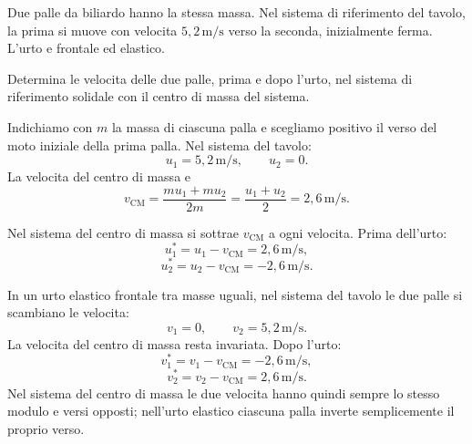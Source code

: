 
\begin{esercizio}
Due palle da biliardo hanno la stessa massa. Nel sistema di riferimento del
tavolo, la prima si muove con velocita \(5{,}2\,\mathrm{m/s}\) verso la
seconda, inizialmente ferma. L'urto e frontale ed elastico.

Determina le velocita delle due palle, prima e dopo l'urto, nel sistema di
riferimento solidale con il centro di massa del sistema.
\end{esercizio}

\begin{soluzione}
Indichiamo con \(m\) la massa di ciascuna palla e scegliamo positivo il verso
del moto iniziale della prima palla. Nel sistema del tavolo:
\[
u_1=5{,}2\,\mathrm{m/s},
\qquad
u_2=0.
\]
La velocita del centro di massa e
\[
v_{\mathrm{CM}}
=\frac{m u_1+m u_2}{2m}
=\frac{u_1+u_2}{2}
=2{,}6\,\mathrm{m/s}.
\]

Nel sistema del centro di massa si sottrae \(v_{\mathrm{CM}}\) a ogni
velocita. Prima dell'urto:
\[
u_1^*=u_1-v_{\mathrm{CM}}=2{,}6\,\mathrm{m/s},
\]
\[
u_2^*=u_2-v_{\mathrm{CM}}=-2{,}6\,\mathrm{m/s}.
\]

In un urto elastico frontale tra masse uguali, nel sistema del tavolo le due
palle si scambiano le velocita:
\[
v_1=0,
\qquad
v_2=5{,}2\,\mathrm{m/s}.
\]
La velocita del centro di massa resta invariata. Dopo l'urto:
\[
v_1^*=v_1-v_{\mathrm{CM}}=-2{,}6\,\mathrm{m/s},
\]
\[
v_2^*=v_2-v_{\mathrm{CM}}=2{,}6\,\mathrm{m/s}.
\]
Nel sistema del centro di massa le due velocita hanno quindi sempre lo stesso
modulo e versi opposti; nell'urto elastico ciascuna palla inverte semplicemente
il proprio verso.
\end{soluzione}
